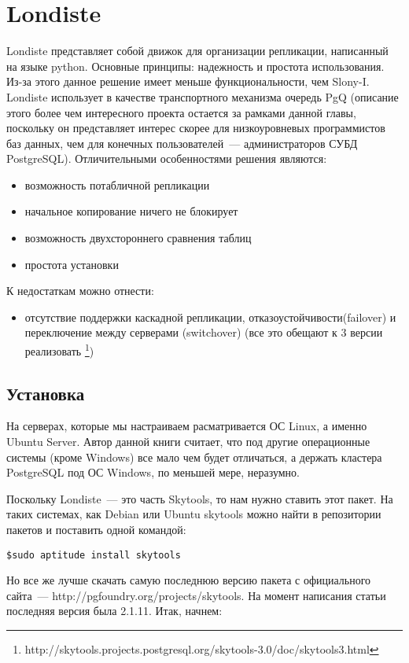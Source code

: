 \section{Londiste}
Londiste представляет собой движок для организации репликации, написанный на языке python. 
Основные принципы: надежность и простота использования. Из-за этого данное решение имеет меньше функциональности, 
чем Slony-I. Londiste использует в качестве транспортного механизма очередь PgQ  (описание этого более чем интересного 
проекта остается за рамками данной главы, поскольку он представляет интерес скорее для низкоуровневых программистов 
баз данных, чем для конечных пользователей~--- администраторов СУБД PostgreSQL). Отличительными особенностями решения являются:
\begin{itemize}
\item возможность потабличной репликации
\item начальное копирование ничего не блокирует
\item возможность двухстороннего сравнения таблиц
\item простота установки
\end{itemize}

К недостаткам можно отнести:
\begin{itemize}
\item отсутствие поддержки каскадной репликации, отказоустойчивости(failover) и переключение между 
серверами (switchover) (все это обещают к 3 версии реализовать
\footnote{http://skytools.projects.postgresql.org/skytools-3.0/doc/skytools3.html})
\end{itemize}


\subsection{Установка}
На серверах, которые мы настраиваем расматривается ОС Linux, а именно Ubuntu Server. 
Автор данной книги считает, что под другие операционные системы (кроме Windows) все мало чем будет отличаться, 
а держать кластера PostgreSQL под ОС Windows, по меньшей мере, неразумно.

Поскольку Londiste~--- это часть Skytools, то нам нужно ставить этот пакет. На таких системах, как Debian или Ubuntu skytools 
можно найти в репозитории пакетов и поставить одной командой:
\begin{verbatim}
$sudo aptitude install skytools
\end{verbatim}

Но все же лучше скачать самую последнюю версию пакета с официального сайта~--- http://pgfoundry.org/projects/skytools. 
На момент написания статьи последняя версия была 2.1.11. Итак, начнем:

